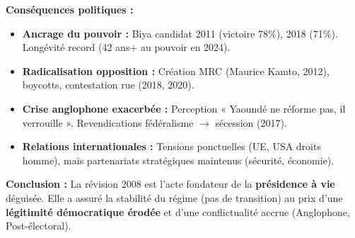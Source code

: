 \documentclass[11pt]{article}
\begin{document}
\begin{exoresolu}
\begin{enumerate}
\end{enumerate}
\textbf{Conséquences politiques :}
\begin{itemize}
    \item \textbf{Ancrage du pouvoir :} Biya candidat 2011 (victoire 78\%), 2018 (71\%). Longévité record (42 ans+ au pouvoir en 2024).
    \item \textbf{Radicalisation opposition :} Création MRC (Maurice Kamto, 2012), boycotts, contestation rue (2018, 2020).
    \item \textbf{Crise anglophone exacerbée :} Perception « Yaoundé ne réforme pas, il verrouille ». Revendications fédéralisme $\rightarrow$ sécession (2017).
    \item \textbf{Relations internationales :} Tensions ponctuelles (UE, USA droits homme), mais partenariats stratégiques maintenus (sécurité, économie).
\end{itemize}
\textbf{Conclusion :} La révision 2008 est l'acte fondateur de la \textbf{présidence à vie} déguisée. Elle a assuré la stabilité du régime (pas de transition) au prix d'une \textbf{légitimité démocratique érodée} et d'une conflictualité accrue (Anglophone, Post-électoral).
\end{exoresolu}
\end{document}

